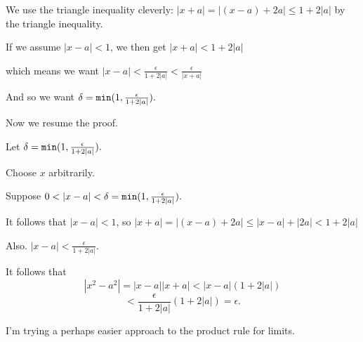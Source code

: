 \documentclass[12pt]{article}
\begin{document}
\begin{description}
We use the triangle inequality cleverly:  $|x+a| = |(x-a)+2a| \leq 1+2|a|$ by the triangle inequality.

If we assume $|x-a|<1$, we then get $|x+a|  < 1+2|a|$

which means we want $|x-a| < \frac\epsilon{1+2|a|}< \frac \epsilon{|x+a|}$

And so we want $\delta = {\tt min}(1,\frac\epsilon{1+2|a|}).$

Now we resume the proof.

Let $\delta = {\tt min}(1,\frac\epsilon{1+2|a|}).$

Choose $x$ arbitrarily.

Suppose $0 < |x-a| <\delta = {\tt min}(1,\frac\epsilon{1+2|a|}).$

It follows that $|x-a|<1$, so $|x+a| = |(x-a)+2a| \leq |x-a|+|2a| < 1+2|a|$

Also. $|x-a|<\frac\epsilon{1+2|a|}$.

It follows that $$|x^2-a^2| = |x-a||x+a| < |x-a|(1+2|a|) $$ $$< \frac\epsilon{1+2|a|}(1+2|a|) = \epsilon.$$

\end{description}

I'm trying a perhaps easier approach to the product rule for limits.
\end{document}

